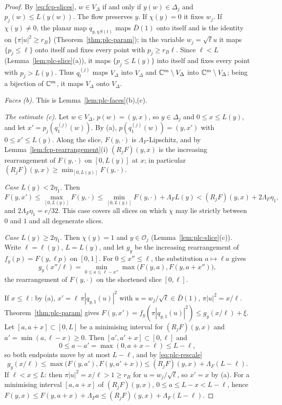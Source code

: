\begin{proof}
By \eqref{eq:fcp-slices}, $w\in V_\Delta$ if and only if $y(w)\in\Delta_j$ and $p_j(w)\le L(y(w))$. The flow preserves $y$. If $\chi(y)=0$ it
fixes $w_j$. If $\chi(y)\ne0$, the planar map $q_{y,\chi S(t)}$ maps $\bar D(1)$ onto itself and is the identity on $\{\pi|u|^2\ge r_B\}$
(Theorem~\ref{thm:plc-param}); in the variable $w_j=\sqrt\ell u$ it maps $\{p_j\le\ell\}$ onto itself and fixes every point with
$p_j\ge r_B\ell$. Since $\ell<L$ (Lemma~\ref{lem:plc-slice}(a)), it maps $\{p_j\le L(y)\}$ into itself and fixes every point with
$p_j>L(y)$. Thus $q^{(j)}_t$ maps $V_\Delta$ into $V_\Delta$ and $\mathbb{C}^m\setminus V_\Delta$ into $\mathbb{C}^m\setminus V_\Delta$; being a bijection of
$\mathbb{C}^m$, it maps $V_\Delta$ onto $V_\Delta$.

\emph{Faces (b).} This is Lemma~\ref{lem:plc-faces}(b),(c).

\emph{The estimate (c).} Let $w\in V_\Delta$, $p(w)=(y,x)$, so $y\in\Delta_j$ and $0\le x\le L(y)$, and let $x'=p_j(q^{(j)}_1(w))$. By (a),
$p(q^{(j)}_1(w))=(y,x')$ with $0\le x'\le L(y)$. Along the slice, $F(y,\cdot)$ is $\Lambda_F$-Lipschitz, and by
Lemma~\ref{lem:fcp-rearrangement}(i) $(R_jF)(y,x)$ is the increasing rearrangement of $F(y,\cdot)$ on $[0,L(y)]$ at $x$; in particular
$(R_jF)(y,x)\ge\min_{[0,L(y)]}F(y,\cdot)$.

\emph{Case $L(y)<2\eta_1$.} Then
\[
 F(y,x')\le\max_{[0,L(y)]}F(y,\cdot)\le\min_{[0,L(y)]}F(y,\cdot)+\Lambda_FL(y)<(R_jF)(y,x)+2\Lambda_F\eta_1,
\]
and $2\Lambda_F\eta_1=e/32$. This case covers all slices on which $\chi$ may lie strictly between $0$ and $1$ and all degenerate
slices.

\emph{Case $L(y)\ge2\eta_1$.} Then $\chi(y)=1$ and $y\in\mathcal O_j$ (Lemma~\ref{lem:plc-slice}(c)). Write $\ell=\ell(y)$, $L=L(y)$, and let
$g_y$ be the increasing rearrangement of $f_y(p)=F(y,\ell p)$ on $[0,1]$. For $0\le x''\le\ell$, the substitution $a\mapsto\ell a$ gives
\begin{equation}\label{eq:plc-rescale}
 g_y(x''/\ell)=\min_{0\le a\le\ell-x''}\max\bigl(F(y,a),F(y,a+x'')\bigr),
\end{equation}
the rearrangement of $F(y,\cdot)$ on the shortened slice $[0,\ell]$.

If $x\le\ell$: by (a), $x'=\ell\,\pi|q_{y,1}(u)|^2$ with $u=w_j/\sqrt\ell\in\bar D(1)$, $\pi|u|^2=x/\ell$. Theorem~\ref{thm:plc-param} gives
$F(y,x')=f_y(\pi|q_{y,1}(u)|^2)\le g_y(x/\ell)+\xi$. Let $[a,a+x]\subset[0,L]$ be a minimising interval for $(R_jF)(y,x)$ and
$a'=\min(a,\ell-x)\ge0$. Then $[a',a'+x]\subset[0,\ell]$ and
\[
 0\le a-a'=\max(0,a+x-\ell)\le L-\ell,
\]
so both endpoints move by at most $L-\ell$,
and by \eqref{eq:plc-rescale}
\[
 g_y(x/\ell)\le\max\bigl(F(y,a'),F(y,a'+x)\bigr)\le(R_jF)(y,x)+\Lambda_F(L-\ell).
\]
If $\ell<x\le L$: then $\pi|u|^2=x/\ell>1\ge r_B$ for $u=w_j/\sqrt\ell$, so $x'=x$ by (a). For a minimising interval $[a,a+x]$ of
$(R_jF)(y,x)$, $0\le a\le L-x<L-\ell$, hence $F(y,x)\le F(y,a+x)+\Lambda_Fa\le(R_jF)(y,x)+\Lambda_F(L-\ell)$.


\end{proof}
